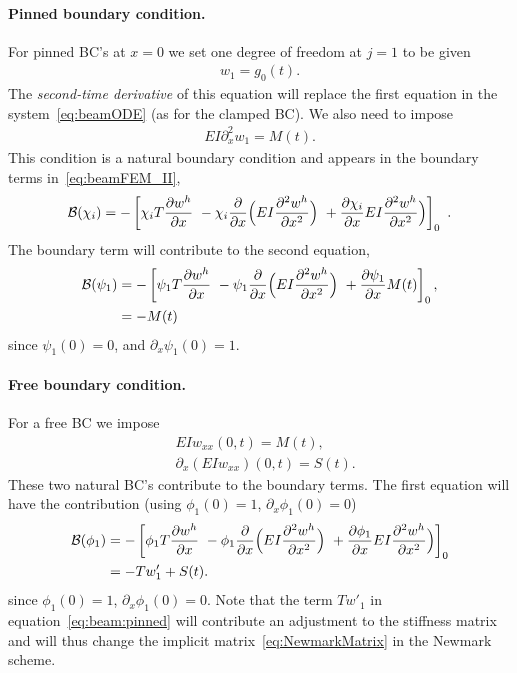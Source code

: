 \documentclass[11pt]{article}
\begin{document}
\paragraph{Pinned boundary condition.} For pinned BC's at $x=0$ we set one degree of
freedom at $j=1$ to be given
\begin{align}
  w_1 = g_0(t) .
\end{align}
The {\em second-time derivative} of this equation will replace the first equation in the system~\eqref{eq:beamODE} (as for
the clamped BC).  
We also need to impose
\begin{align}
  EI \partial_x^2 w_1 = M(t). 
\end{align}
This condition is a natural boundary condition and appears in the boundary terms in~\eqref{eq:beamFEM_II}, 
\begin{align}
   \mathcal{B}(\chi_i) = -\left[ \chi_i T \frac{\partial w^h}{\partial x} ~ - \chi_i \frac{\partial}{\partial x}\Big( E I \frac{\partial^2 w^h}{\partial x^2}\Big) 
                      ~ + \frac{\partial \chi_i}{\partial x}E I \frac{\partial^2 w^h}{\partial x^2}\Big)  
                      \right]_0 ~.
\end{align}
The boundary term will contribute to the second equation, 
\begin{align}
   \mathcal{B}(\psi_1) &= -\left[ \psi_1 T \frac{\partial w^h}{\partial x} ~ - \psi_1 \frac{\partial}{\partial x}\Big( E I \frac{\partial^2 w^h}{\partial x^2}\Big) 
                      ~ + \frac{\partial \psi_1}{\partial x} M(t)  
                      \right]_0, \\
        &= -M(t) 
\end{align}
since $\psi_1(0)=0$, and $\partial_x\psi_1(0)=1$. 

\paragraph{Free boundary condition.} For a free BC we impose
\begin{align}
&    E I w_{xx}(0,t)=M(t), \\
&   \partial_x( E I w_{xx})(0,t)=S(t) .
\end{align}
These two natural BC's contribute to the boundary terms.
The first equation will have the contribution (using $\phi_1(0)=1$, $\partial_x\phi_1(0)=0$)
\begin{align}
   \mathcal{B}(\phi_1) &= -\left[ \phi_1 T \frac{\partial w^h}{\partial x} ~ - \phi_1 \frac{\partial}{\partial x}\Big( E I \frac{\partial^2 w^h}{\partial x^2}\Big) 
                      ~ + \frac{\partial \phi_1}{\partial x}E I \frac{\partial^2 w^h}{\partial x^2}\Big)  
                      \right]_0  \\
     &=  -T w'_1   + S(t) . \label{eq:beam:pinned}
\end{align}
since $\phi_1(0)=1$, $\partial_x\phi_1(0)=0$.
Note that the term $T w'_1$ in equation~\eqref{eq:beam:pinned} will contribute an adjustment to the stiffness matrix
and will thus change the implicit matrix~\eqref{eq:NewmarkMatrix} in the Newmark scheme.
\end{document}
